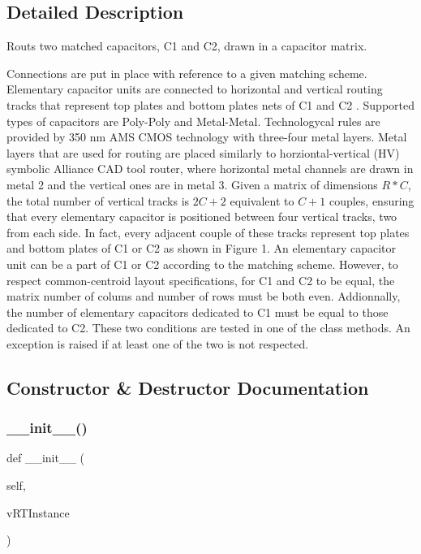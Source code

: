 \subsection{Detailed Description}
Routs two matched capacitors, C1 and C2, drawn in a capacitor matrix. 

Connections are put in place with reference to a given matching scheme. Elementary capacitor units are connected to horizontal and vertical routing tracks that represent top plates and bottom plates nets of C1 and C2 . Supported types of capacitors are Poly-\/\+Poly and Metal-\/\+Metal. Technologycal rules are provided by 350 nm A\+MS C\+M\+OS technology with three-\/four metal layers. Metal layers that are used for routing are placed similarly to horziontal-\/vertical (HV) symbolic Alliance C\+AD tool router, where horizontal metal channels are drawn in metal 2 and the vertical ones are in metal 3. Given a matrix of dimensions $ R*C $, the total number of vertical tracks is $ 2C+2 $ equivalent to $ C+1 $ couples, ensuring that every elementary capacitor is positioned between four vertical tracks, two from each side. In fact, every adjacent couple of these tracks represent top plates and bottom plates of C1 or C2 as shown in Figure 1.  An elementary capacitor unit can be a part of C1 or C2 according to the matching scheme. However, to respect common-\/centroid layout specifications, for C1 and C2 to be equal, the matrix number of colums and number of rows must be both even. Addionnally, the number of elementary capacitors dedicated to C1 must be equal to those dedicated to C2. These two conditions are tested in one of the class methods. An exception is raised if at least one of the two is not respected. 

\subsection{Constructor \& Destructor Documentation}
\mbox{\label{classpython_1_1capacitorrouted_1_1RoutMatchedCapacitor_acb14d0c0bde8b81f13e2f4c773691d69}} 
\subsubsection{\texorpdfstring{\+\_\+\+\_\+init\+\_\+\+\_\+()}{\_\_init\_\_()}}
{\footnotesize\ttfamily def \+\_\+\+\_\+init\+\_\+\+\_\+ (\begin{DoxyParamCaption}\item[{}]{self,  }\item[{}]{v\+R\+T\+Instance }\end{DoxyParamCaption})}




